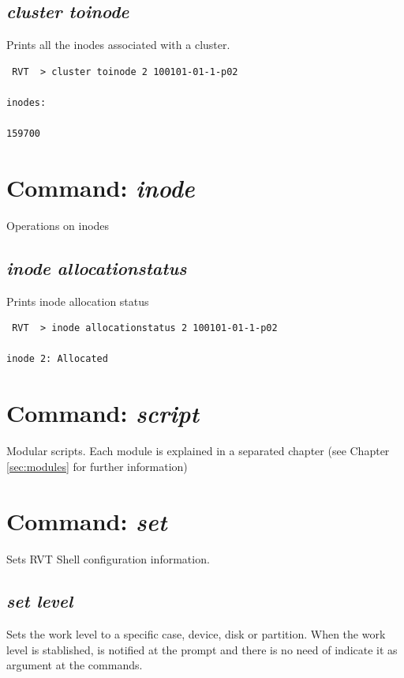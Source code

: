 \documentclass[a4paper,11pt,oneside]{report}
\begin{document}
\subsection{\emph{cluster toinode}}

Prints all the inodes associated with a cluster.

\begin{verbatim}
 RVT  > cluster toinode 2 100101-01-1-p02                                     

inodes:

159700
\end{verbatim}



\section{Command: \emph{inode}}

Operations on inodes

\subsection{\emph{inode allocationstatus}}

Prints inode allocation status

\begin{verbatim}
 RVT  > inode allocationstatus 2 100101-01-1-p02

inode 2: Allocated
\end{verbatim}



\section{Command: \emph{script}}

Modular scripts. Each module is explained in a separated chapter (see Chapter \ref{sec:modules} for further information)


\section{Command: \emph{set}}

Sets RVT Shell configuration information.

\subsection{\emph{set level}}  \label{cmd:set-level}

Sets the work level to a specific case, device, disk or partition. When the work level is stablished, is notified at the prompt and there is no need of indicate it as argument at the commands.
\end{document}
